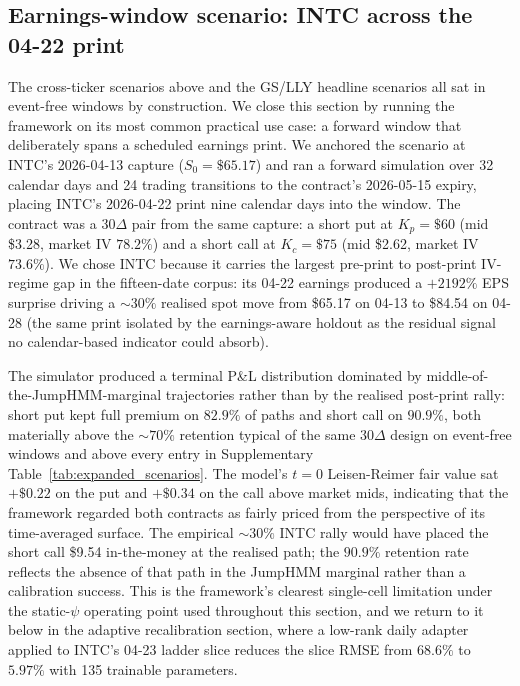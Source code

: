 \subsection{Earnings-window scenario: INTC across the 04-22 print}\label{sec:earnings_window}

The cross-ticker scenarios above and the GS/LLY headline scenarios all sat in event-free windows by construction. We close this section by running the framework on its most common practical use case: a forward window that deliberately spans a scheduled earnings print. We anchored the scenario at INTC's 2026-04-13 capture ($S_0 = \$65.17$) and ran a forward simulation over 32 calendar days and 24 trading transitions to the contract's 2026-05-15 expiry, placing INTC's 2026-04-22 print nine calendar days into the window. The contract was a $30\Delta$ pair from the same capture: a short put at $K_p = \$60$ (mid \$3.28, market IV $78.2\%$) and a short call at $K_c = \$75$ (mid \$2.62, market IV $73.6\%$). We chose INTC because it carries the largest pre-print to post-print IV-regime gap in the fifteen-date corpus: its 04-22 earnings produced a $+2192\%$ EPS surprise driving a $\sim 30\%$ realised spot move from \$65.17 on 04-13 to \$84.54 on 04-28 (the same print isolated by the earnings-aware holdout as the residual signal no calendar-based indicator could absorb).

The simulator produced a terminal P\&L distribution dominated by middle-of-the-JumpHMM-marginal trajectories rather than by the realised post-print rally: short put kept full premium on $82.9\%$ of paths and short call on $90.9\%$, both materially above the $\sim 70\%$ retention typical of the same $30\Delta$ design on event-free windows and above every entry in Supplementary Table~\ref{tab:expanded_scenarios}. The model's $t=0$ Leisen-Reimer fair value sat $+\$0.22$ on the put and $+\$0.34$ on the call above market mids, indicating that the framework regarded both contracts as fairly priced from the perspective of its time-averaged surface. The empirical $\sim 30\%$ INTC rally would have placed the short call \$9.54 in-the-money at the realised path; the $90.9\%$ retention rate reflects the absence of that path in the JumpHMM marginal rather than a calibration success. This is the framework's clearest single-cell limitation under the static-$\psi$ operating point used throughout this section, and we return to it below in the adaptive recalibration section, where a low-rank daily adapter applied to INTC's 04-23 ladder slice reduces the slice RMSE from $68.6\%$ to $5.97\%$ with 135 trainable parameters.

